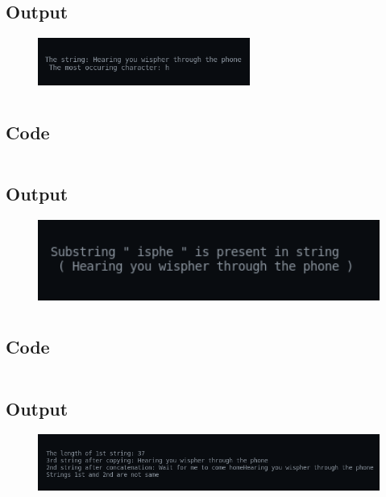 \documentclass[12pt]{article}
\begin{document}
\subsection{Output}
\begin{figure}[h]
    \centering
    \includegraphics[width=0.62\textwidth]{14.png}
\end{figure}

\newpage
\section{}
\subsection{Code}
\inputminted{c}{q15.c}
\subsection{Output}
\begin{figure}[h]
    \centering
    \includegraphics[width=1.0\textwidth]{15.png}
\end{figure}

\newpage
\section{}
\subsection{Code}
\inputminted{c}{q16.c}
\subsection{Output}
\begin{figure}[h]
    \centering
    \includegraphics[width=1.0\textwidth]{16.png}
\end{figure}
\end{document}
